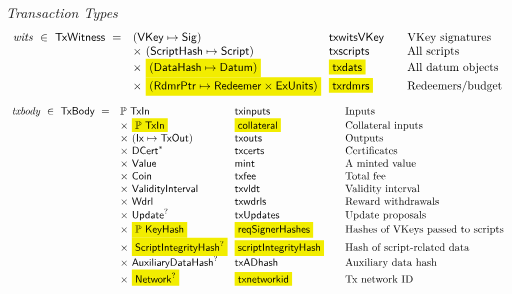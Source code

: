 \begin{figure*}[htb]
  \emph{Transaction Types}
  \begin{equation*}
    \begin{array}{r@{~~}l@{~~}l@{\qquad}l}
      \var{wits} ~\in~ \TxWitness ~=~
       & (\VKey \mapsto \Sig) & \fun{txwitsVKey} & \text{VKey signatures}\\
       & \times ~(\ScriptHash \mapsto \Script)  & \fun{txscripts} & \text{All scripts}\\
       & \times~ \hldiff{(\DataHash \mapsto \Datum)} & \hldiff{\fun{txdats}} & \text{All datum objects}\\
       & \times ~\hldiff{(\RdmrPtr \mapsto \Redeemer \times \ExUnits)}& \hldiff{\fun{txrdmrs}}& \text{Redeemers/budget}\\
    \end{array}
  \end{equation*}
  \begin{equation*}
    \begin{array}{r@{~~}l@{~~}l@{\qquad}l}
      \var{txbody} ~\in~ \TxBody ~=~
      & \powerset{\TxIn} & \fun{txinputs}& \text{Inputs}\\
      & \times ~\hldiff{\powerset{\TxIn}} & \hldiff{\fun{collateral}} & \text{Collateral inputs}\\
      & \times ~(\Ix \mapsto \TxOut) & \fun{txouts}& \text{Outputs}\\
      & \times~ \seqof{\DCert} & \fun{txcerts}& \text{Certificates}\\
       & \times ~\Value  & \fun{mint} &\text{A minted value}\\
       & \times ~\Coin & \fun{txfee} &\text{Total fee}\\
       & \times ~\ValidityInterval & \fun{txvldt} & \text{Validity interval}\\
       & \times~ \Wdrl  & \fun{txwdrls} &\text{Reward withdrawals}\\
       & \times ~\Update^?  & \fun{txUpdates} & \text{Update proposals}\\
       & \times ~\hldiff{\powerset{\KeyHash}} & \hldiff{\fun{reqSignerHashes}} & \text{Hashes of VKeys passed to scripts}\\
       & \times ~\hldiff{\ScriptIntegrityHash^?} & \hldiff{\fun{scriptIntegrityHash}} & \text{Hash of script-related data}\\
       & \times ~\AuxiliaryDataHash^? & \fun{txADhash} & \text{Auxiliary data hash}\\
       & \times ~\hldiff{\Network^?} & \hldiff{\fun{txnetworkid}} & \text{Tx network ID}\\

\end{array}
\end{equation*}
\end{figure*}
